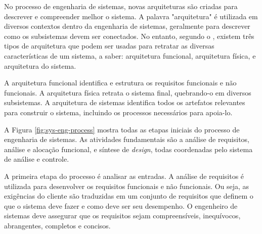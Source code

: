 
    No processo de engenharia de sistemas, novas arquiteturas são criadas para descrever e compreender melhor o sistema. A palavra "arquitetura" é utilizada em diversos contextos dentro da engenharia de sistemas, geralmente para descrever como os subsistemas devem ser conectados. No entanto, segundo o , existem três tipos de arquitetura que podem ser usadas para retratar as diversas características de um sistema, a saber: arquitetura funcional, arquitetura física, e arquitetura do sistema. 
    
    A arquitetura funcional identifica e estrutura os requisitos funcionais e não funcionais. A arquitetura física retrata o sistema final, quebrando-o em diversos subsistemas. A arquitetura de sistemas identifica todos os artefatos relevantes para construir o sistema, incluindo os processos necessários para apoia-lo.
    
    A Figura \ref{fig:sys-eng-process} mostra todas as etapas iniciais do processo de engenharia de sistemas. As atividades fundamentais são a análise de requisitos, análise e alocação funcional, e síntese de \textit{design}, todas coordenadas pelo sistema de análise e controle.
        
    \begin{figure}[h!]
        \centering
    \end{figure}
    
    A primeira etapa do processo é analisar as entradas. A análise de requisitos é utilizada para desenvolver os requisitos funcionais e não funcionais. Ou seja, as exigências do cliente são traduzidas em um conjunto de requisitos que definem o que o sistema deve fazer e como deve ser seu desempenho. O engenheiro de sistemas deve assegurar que os requisitos sejam compreensíveis, inequívocos, abrangentes, completos e concisos.
    

